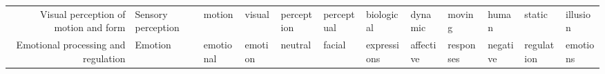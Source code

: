 \begin{tabular}{rlllllllllll}
              Visual perception of motion and form &  Sensory perception &           motion &        visual &      perception &     perceptual &  biological &        dynamic &        moving &          human &        static &       illusion \\
               Emotional processing and regulation &             Emotion &        emotional &       emotion &         neutral &         facial & expressions &      affective &     responses &       negative &    regulation &       emotions \\
\bottomrule
\end{tabular}

